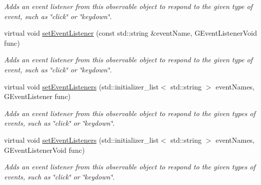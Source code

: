 \begin{DoxyCompactItemize}
\begin{DoxyCompactList}\small\item\em Adds an event listener from this observable object to respond to the given type of event, such as \char`\"{}click\char`\"{} or \char`\"{}keydown\char`\"{}. \end{DoxyCompactList}\item 
virtual void \mbox{\hyperlink{classGObservable_abac4cb9f9e626e010e87f5d91573c8a5}{set\+Event\+Listener}} (const std\+::string \&event\+Name, G\+Event\+Listener\+Void func)
\begin{DoxyCompactList}\small\item\em Adds an event listener from this observable object to respond to the given type of event, such as \char`\"{}click\char`\"{} or \char`\"{}keydown\char`\"{}. \end{DoxyCompactList}\item 
virtual void \mbox{\hyperlink{classGObservable_afa388d69c33c718cf035774604065604}{set\+Event\+Listeners}} (std\+::initializer\+\_\+list$<$ std\+::string $>$ event\+Names, G\+Event\+Listener func)
\begin{DoxyCompactList}\small\item\em Adds an event listener from this observable object to respond to the given types of events, such as \char`\"{}click\char`\"{} or \char`\"{}keydown\char`\"{}. \end{DoxyCompactList}\item 
virtual void \mbox{\hyperlink{classGObservable_a7867184bbb686f74fae8a4db927da799}{set\+Event\+Listeners}} (std\+::initializer\+\_\+list$<$ std\+::string $>$ event\+Names, G\+Event\+Listener\+Void func)
\begin{DoxyCompactList}\small\item\em Adds an event listener from this observable object to respond to the given types of events, such as \char`\"{}click\char`\"{} or \char`\"{}keydown\char`\"{}. \end{DoxyCompactList}\end{DoxyCompactItemize}
